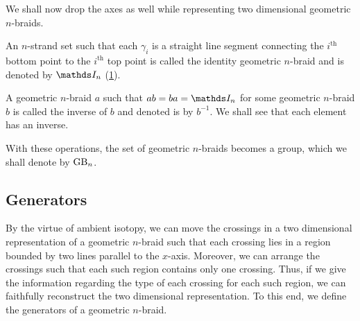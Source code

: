 We shall now drop the axes as well while representing two dimensional geometric \(n\)-braids.

An \(n\)-strand set such that each \(\gamma_i\) is a straight line segment connecting the \(i^\text{th}\) bottom point to the \(i^\text{th}\) top point is called the identity geometric \(n\)-braid and is denoted by \(\In\) (\cref{fig:braididentity}).

\begin{figure}[H]\centering
	\label{fig:braididentity}
\end{figure}

A geometric \(n\)-braid \(a\) such that \(ab = ba = \In\) for some geometric \(n\)-braid \(b\) is called the inverse of \(b\) and denoted is by \(b^{-1}\). We shall see that each element has an inverse.

With these operations, the set of geometric \(n\)-braids becomes a group, which we shall denote by \(\text{GB}_n\).

\subsection{Generators}

By the virtue of ambient isotopy, we can move the crossings in a two dimensional representation of a geometric \(n\)-braid such that each crossing lies in a region bounded by two lines parallel to the \(x\)-axis. Moreover, we can arrange the crossings such that each such region contains only one crossing. Thus, if we give the information regarding the type of each crossing for each such region, we can faithfully reconstruct the two dimensional representation. To this end, we define the generators of a geometric \(n\)-braid.

